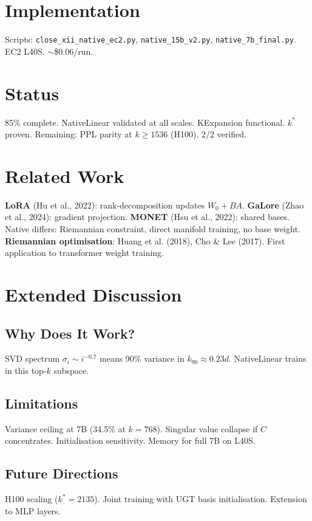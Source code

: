 \documentclass[11pt,a4paper]{article}
\begin{document}
\section{Implementation}
Scripts: \texttt{close\_xii\_native\_ec2.py}, \texttt{native\_15b\_v2.py}, \texttt{native\_7b\_final.py}. EC2 L40S. $\sim$\$0.06/run.

\section{Status}
85\% complete. NativeLinear validated at all scales. KExpansion functional. $k^*$ proven. Remaining: PPL parity at $k \ge 1536$ (H100). 2/2 verified.

\newpage

\section{Related Work}
\textbf{LoRA} (Hu et al., 2022): rank-decomposition updates $W_0 + BA$. \textbf{GaLore} (Zhao et al., 2024): gradient projection. \textbf{MONET} (Hsu et al., 2022): shared bases. Native differs: Riemannian constraint, direct manifold training, no base weight. \textbf{Riemannian optimisation}: Huang et al. (2018), Cho \& Lee (2017). First application to transformer weight training.

\section{Extended Discussion}
\subsection{Why Does It Work?}
SVD spectrum $\sigma_i \sim i^{-0.7}$ means 90\% variance in $k_{90} \approx 0.23d$. NativeLinear trains in this top-$k$ subspace.

\subsection{Limitations}
Variance ceiling at 7B (34.5\% at $k=768$). Singular value collapse if $C$ concentrates. Initialisation sensitivity. Memory for full 7B on L40S.

\subsection{Future Directions}
H100 scaling ($k^*=2135$). Joint training with UGT basis initialisation. Extension to MLP layers.
\end{document}
